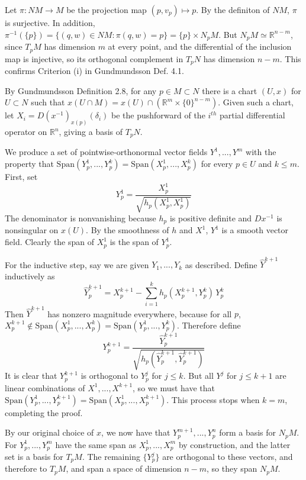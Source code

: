 \documentclass[10pt,letter]{article}
\begin{document}
Let $\pi: NM \rightarrow M$ be the projection map $(p,v_p) \mapsto p$. By the definiton of $NM$, $\pi$ is surjective. In addition, $\pi^{-1}(\lbrace p \rbrace) = \lbrace (q,w) \in NM: \pi(q,w) = p \rbrace = \lbrace p \rbrace \times N_pM$. But $N_pM \simeq \mathbb{R}^{n-m}$, since $T_pM$ has dimension $m$ at every point, and the differential of the inclusion map is injective, so its orthogonal complement in $T_pN$ has dimension $n-m$. This confirms Criterion (i) in Gundmundsson Def. 4.1.

By Gundmundsson Definition 2.8, for any $p \in M \subset N$ there is a chart $(U,x)$ for $U \subset N$ such that $x(U \cap M) = x(U) \cap (\mathbb{R}^{m} \times \lbrace 0 \rbrace^{n-m})$.  Given such a chart, let $X_i = D(x^{-1})_{x(p)}(\delta_i)$ be the pushforward of the $i^{th}$ partial differential operator on $\mathbb{R}^n$, giving a basis of $T_pN$. 

We produce a set of pointwise-orthonormal vector fields $Y^1,...,Y^m$ with the property that $\text{Span}(Y^1_p,...,Y^k_p) = \text{Span}(X^1_p,...,X^k_p)$ for every $p \in U$ and $k \leq m$. First, set 
\begin{equation*}
Y^1_p = \frac{X^1_p}{\sqrt{h_p(X^1_p,X^1_p)}}
\end{equation*}
The denominator is nonvanishing because $h_p$ is positive definite and $Dx^{-1}$ is nonsingular on $x(U)$. By the smoothness of $h$ and $X^1$, $Y^1$ is a smooth vector field. Clearly the span of $X^1_p$ is the span of $Y^1_p$. 

For the inductive step, say we are given $Y_1,...,Y_k$ as described. Define $\hat{Y}^{k+1}$ inductively as
\begin{equation*}
\hat{Y}^{k+1}_p = X^{k+1}_p - \sum_{i=1}^k h_p(X^{k+1}_p,Y^k_p) \, Y^k_p
\end{equation*}
Then $\hat{Y}^{k+1}$ has nonzero magnitude everywhere, because for all $p$, $X^{k+1}_p \not \in \text{Span}(X^1_p,...,X^k_p) = \text{Span}(Y^1_p,...,Y^k_p)$. Therefore define 
\begin{equation*}
Y^{k+1}_p = \frac{\hat{Y}^{k+1}_p}{\sqrt{h_p(\hat{Y}^{k+1}_p,\hat{Y}^{k+1}_p)}}
\end{equation*}
It is clear that $Y^{k+1}_p$ is orthogonal to $Y^j_p$ for $j \leq k$. But all $Y^j$ for $j \leq k+1$ are linear combinations of $X^1,...,X^{k+1}$, so we must have that $\text{Span}(Y^1_p,...,Y^{k+1}_p) = \text{Span}(X^1_p,...,X^{k+1}_p)$. This process stops when $k = m$, completing the proof. 

By our original choice of $x$, we now have that $Y^{m+1}_p,...,Y^{n}_p$ form a basis for $N_pM$. For $Y^1_p,...,Y^m_p$ have the same span as $X^1_p,...,X^m_p$ by construction, and the latter set is a basis for $T_pM$. The remaining $\lbrace Y^j_p \rbrace$ are orthogonal to these vectors, and therefore to $T_pM$, and span a space of dimension $n-m$, so they span $N_pM$. 
\end{document}
